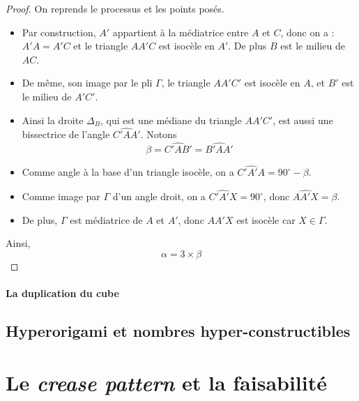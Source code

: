 \documentclass[a4paper,12pt,french]{report}
\begin{document}
		\begin{proof}
			On reprends le processus et les points posés.
			\begin{itemize}
				\item Par construction, $A'$ appartient à la médiatrice entre $A$ et $C$, donc on a :
				\(
					A'A = A'C
				\)
				 et le triangle $AA'C$ est isocèle en $A'$. De plus $B$ est le milieu de $AC$.
				\item De même, son image par le pli $\Gamma$, le triangle $AA'C'$ est isocèle en $A$, et $B'$ est le milieu de $A'C'$. 
				\item Ainsi la droite $\Delta_{B}$, qui est une médiane du triangle $AA'C'$, est aussi une bissectrice de l'angle $\widehat{C'AA'}$. Notons \[\beta = \widehat{C'AB'} = \widehat{B'AA'}\]
				\item Comme angle à la base d'un triangle isocèle, on a $\widehat{C'A'A} = 90^{\circ} - \beta $.
				\item Comme image par $\Gamma$ d'un angle droit, on a $\widehat{C'A'X} = 90^{\circ}$, donc $\widehat{AA'X} = \beta$. 
				\item De plus, $\Gamma$ est médiatrice de $A$ et $A'$, donc $AA'X$ est isocèle car $X\in\Gamma$.
			\end{itemize}
			Ainsi, 
			\[{}
			\alpha = 3 \times \beta{}
			\]
		\end{proof}
		
		
		\subsubsection{La duplication du cube}

	\section{Hyperorigami et nombres hyper-constructibles}
	









	
\chapter{Le \emph{crease pattern} et la faisabilité}
\end{document}
